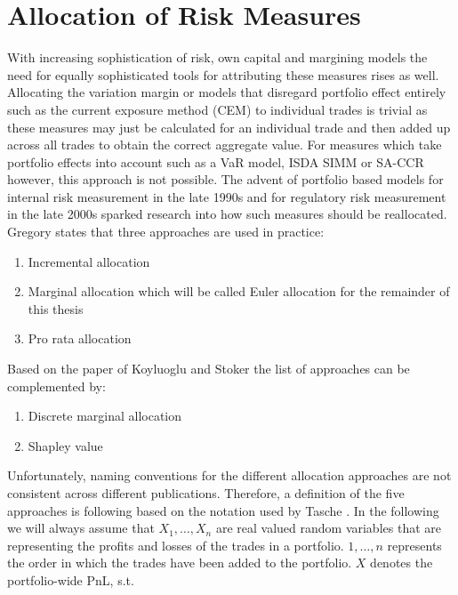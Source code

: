 \documentclass[../Thesis_AHoecherl.tex]{subfiles}
\begin{document}
\section{Allocation of Risk Measures}\label{sec:Allocation of Risk Measures}

With increasing sophistication of risk, own capital and margining models the need for equally sophisticated tools for attributing these measures rises as well. Allocating the variation margin or models that disregard portfolio effect entirely such as the current exposure method (\gls{CEM}) to individual trades is trivial as these measures may just be calculated for an individual trade and then added up across all trades to obtain the correct aggregate value. 
For measures which take portfolio effects into account such as a \gls{VaR} model, \gls{ISDA SIMM} or \gls{SA-CCR} however, this approach is not possible. The advent of portfolio based models for internal risk measurement in the late 1990s and for regulatory risk measurement in the late 2000s sparked research into how such measures should be reallocated. Gregory \cite[Chapter~10.7]{gregory2015xva} states that three approaches are used in practice: 
\begin{enumerate}
\item Incremental allocation
\item Marginal allocation which will be called Euler allocation for the remainder of this thesis  
\item Pro rata allocation
\end{enumerate}

Based on the paper of Koyluoglu and Stoker \cite{koyluoglu2002risk} the list of approaches can be complemented by:
\begin{enumerate}[resume]
    \item Discrete marginal allocation
    \item Shapley value
\end{enumerate}
 
Unfortunately, naming conventions for the different allocation approaches are not consistent across different publications.
Therefore, a definition of the five approaches is following based on the notation used by Tasche \cite{tasche2007}. In the following we will always assume that $X_1, \dots, X_n$ are real valued random variables that are representing the profits and losses of the trades in a portfolio. $1, \dots, n$ represents the order in which the trades have been added to the portfolio. $X$ denotes the portfolio-wide \gls{PnL}, s.t.
\end{document}
